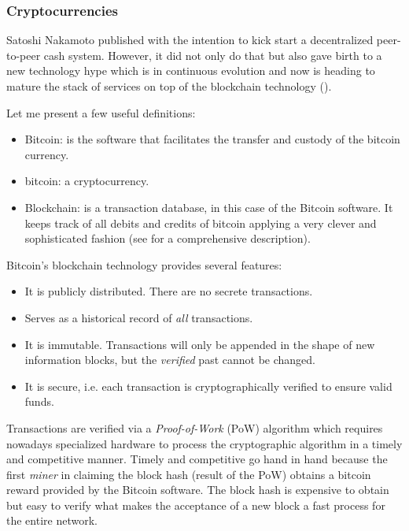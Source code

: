 \subsubsection{Cryptocurrencies}
\label{sec:intro_crypto_currencies}

Satoshi Nakamoto published \cite{bitcoin} with the intention to kick start a decentralized peer-to-peer cash system. However, it did not only do that but also gave birth to a new technology hype which is in continuous evolution and now is heading to mature the stack of services on top of the blockchain technology (\cite{deloitte}).

Let me present a few useful definitions:

\begin{itemize}
    \item Bitcoin: is the software that facilitates the transfer and custody of the bitcoin currency.
    \item bitcoin: a cryptocurrency.
    \item Blockchain: is a transaction database, in this case of the Bitcoin software. It keeps track of all debits and credits of bitcoin applying a very clever and sophisticated fashion (see  \cite{blockchain} for a comprehensive description). 
\end{itemize}

Bitcoin's blockchain technology provides several features:

\begin{itemize}
    \item It is publicly distributed. There are no secrete transactions.
    \item Serves as a historical record of \emph{all} transactions.
    \item It is immutable. Transactions will only be appended in the shape of new information blocks, but the \emph{verified} past cannot be changed.
    \item It is secure, i.e. each transaction is cryptographically verified to ensure valid funds. 
\end{itemize}

Transactions are verified via a \emph{Proof-of-Work} (PoW) algorithm which requires nowadays specialized hardware to process the cryptographic algorithm in a timely and competitive manner. Timely and competitive go hand in hand because the first \emph{miner} in claiming the block hash (result of the PoW) obtains a bitcoin reward provided by the Bitcoin software. The block hash is expensive to obtain but easy to verify what makes the acceptance of a new block a fast process for the entire network.

